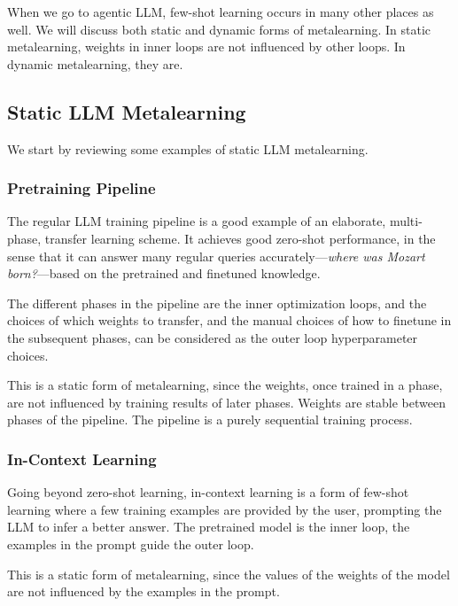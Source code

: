 When we go to agentic LLM, few-shot learning occurs in many other places as well. We will discuss both static and dynamic forms of metalearning. In static metalearning, weights in inner loops are not influenced by other loops. In dynamic metalearning, they are.

\subsection{Static LLM Metalearning}
We start by reviewing some examples of static LLM metalearning.

\subsubsection{Pretraining Pipeline}
The regular LLM training pipeline is a good example of an elaborate, multi-phase, transfer learning scheme. It achieves good zero-shot performance, in the sense that it can answer many regular queries accurately---{\em where was Mozart born?}---based on the pretrained and finetuned knowledge. 

The different phases in the pipeline are the inner optimization loops, and the choices of which weights to transfer, and the manual choices of how to finetune in the subsequent phases, can be considered as the outer loop hyperparameter choices. 

This is a static form of  metalearning, since the weights, once trained in a phase, are not influenced by training results of later phases. Weights are stable between phases of the pipeline. The pipeline is a purely sequential training process. 

\subsubsection{In-Context Learning}
Going beyond zero-shot learning, in-context learning is a form of few-shot learning where a few training examples are provided by the user, prompting the LLM to infer a better answer. The pretrained model is the inner loop, the examples in the prompt guide the outer loop. 

This is a static form of metalearning, since the values of the weights of the model are not influenced by the examples in the prompt.



